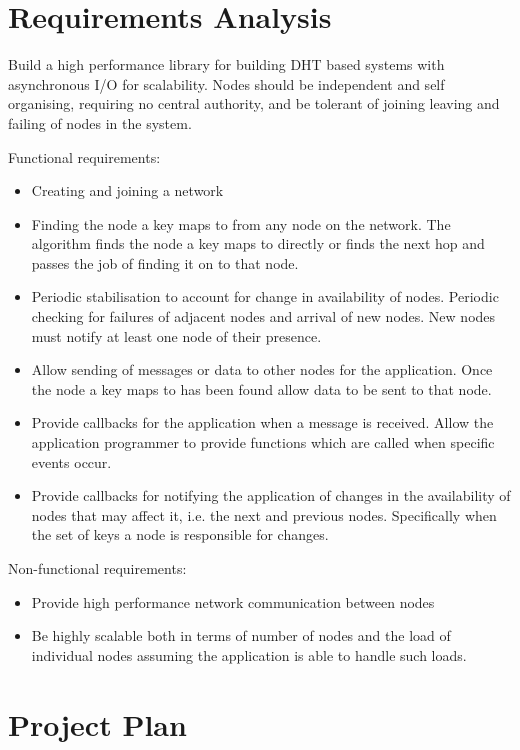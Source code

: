\documentclass{article}
\begin{document}
\section{Requirements Analysis}
Build a high performance library for building DHT based systems with asynchronous I/O for scalability. Nodes should be independent and self organising, requiring no central authority, and be tolerant of joining leaving and failing of nodes in the system.

Functional requirements:
\begin{itemize}
\item
Creating and joining a network
\item
Finding the node a key maps to from any node on the network.
The algorithm finds the node a key maps to directly or finds the next hop and passes the job of finding it on to that node.
\item
Periodic stabilisation to account for change in availability of nodes.
Periodic checking for failures of adjacent nodes and arrival of new nodes. New nodes must notify at least one node of their presence.
\item
Allow sending of messages or data to other nodes for the application.
Once the node a key maps to has been found allow data to be sent to that node.
\item
Provide callbacks for the application when a message is received.
Allow the application programmer to provide functions which are called when specific events occur.
\item
Provide callbacks for notifying the application of changes in the availability of nodes that may affect it, i.e. the next and previous nodes. Specifically when the set of keys a node is responsible for changes.
\end{itemize}


Non-functional requirements:
\begin{itemize}
\item
Provide high performance network communication between nodes
\item
Be highly scalable both in terms of number of nodes and the load of individual nodes assuming the application is able to handle such loads.
\end{itemize}

\section{Project Plan}
\end{document}
